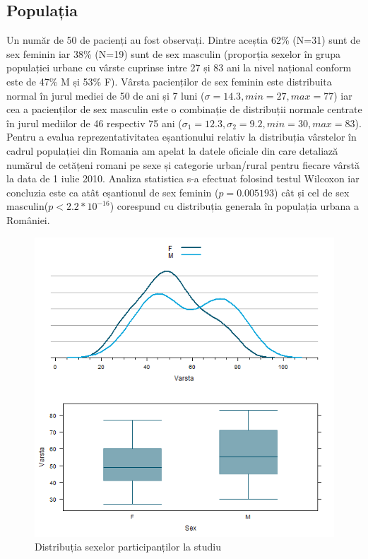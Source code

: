 \documentclass[11pt,draft]{article}
\begin{document}
    \subsection{Populația}
    Un număr de 50 de pacienți au fost observați. Dintre aceștia 62\% (N=31) sunt de sex feminin iar 38\% (N=19) sunt de sex masculin (proporția sexelor în grupa populației urbane cu vârste cuprinse intre 27 și 83 ani la nivel național conform \citep{insee2011} este de 47\% M și 53\% F).
    Vârsta pacienților de sex feminin este distribuita normal în jurul mediei de 50 de ani și 7 luni ($\sigma=14.3,min=27,max=77$) iar cea a pacienților de sex masculin este o combinație de distribuții normale centrate în jurul mediilor de 46 respectiv 75 ani ($\sigma_{1}=12.3 , \sigma_{2}=9.2,min=30,max=83$).
    Pentru a evalua reprezentativitatea eșantionului relativ la distribuția vârstelor în cadrul populației din Romania am apelat la datele oficiale din \citep{insee2011} care detaliază numărul de cetățeni romani pe sexe și categorie urban/rural pentru fiecare vârstă la data de 1 iulie 2010. Analiza statistica s-a efectuat folosind testul Wilcoxon iar concluzia este ca atât eșantionul de sex feminin ($p=0.005193$) cât și cel de sex masculin($p<2.2*10^{-16}$) corespund cu distribuția generala în populația urbana a României.
    \begin{figure}[H]
	\centering
	\includegraphics[width=0.8\linewidth]{incoVarstaSex}
	\caption{Distribuția sexelor participanților la studiu}
	\label{fig:Distributia sexelor participantilor la studiu}
    \end{figure}
\end{document}
